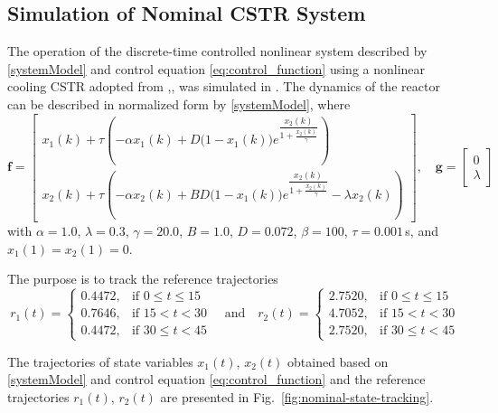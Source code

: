 \subsection{Simulation of Nominal CSTR System}

The operation of the discrete-time controlled nonlinear system described by
\eqref{systemModel} and control equation \eqref{eq:control_function}
using a nonlinear cooling CSTR adopted from
\cite{yan2011model},\cite{soukkou2008optimal},\cite{juang2007recurrent} was
simulated in \cite{tymoshchuk2024tracking}. The dynamics of the reactor can
be described in normalized form by \eqref{systemModel}, where
\begin{equation}
	\label{eq:cstr_dynamics}
	\mathbf{f} =
	\begin{bmatrix}
		x_1(k) + \tau \left( -\alpha x_1(k) + D\bigl(1 - x_1(k)\bigr)
		e^{\dfrac{x_2(k)}{1 + \frac{x_2(k)}{\gamma}}} \right) \\[12pt]
		x_2(k) + \tau \left( -\alpha x_2(k) + BD\bigl(1 - x_1(k)\bigr)
		e^{\dfrac{x_2(k)}{1 + \frac{x_2(k)}{\gamma}}} - \lambda x_2(k) \right)
	\end{bmatrix}, \quad
	\mathbf{g} =
	\begin{bmatrix}
		0 \\ \lambda
	\end{bmatrix}
\end{equation}
with $\alpha = 1.0$, $\lambda = 0.3$, $\gamma = 20.0$,
$B = 1.0$, $D = 0.072$, $\beta = 100$, $\tau = 0.001$\,s,
and $x_1(1) = x_2(1) = 0$.

The purpose is to track the reference trajectories
\begin{equation}
	\label{eq:cstr_references}
	r_1(t) =
	\begin{cases}
		0.4472, & \text{if } 0 \leq t \leq 15 \\
		0.7646, & \text{if } 15 < t < 30      \\
		0.4472, & \text{if } 30 \leq t < 45
	\end{cases}
	\quad \text{and} \quad
	r_2(t) =
	\begin{cases}
		2.7520, & \text{if } 0 \leq t \leq 15 \\
		4.7052, & \text{if } 15 < t < 30      \\
		2.7520, & \text{if } 30 \leq t < 45
	\end{cases}
\end{equation}

The trajectories of state variables $x_1(t)$, $x_2(t)$ obtained based on
\eqref{systemModel} and control equation \eqref{eq:control_function}
and the reference trajectories $r_1(t)$, $r_2(t)$ are presented in
Fig.~\ref{fig:nominal-state-tracking}.

